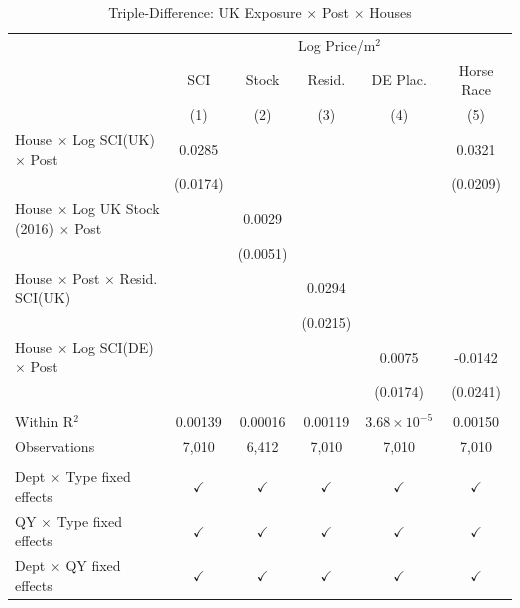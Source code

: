 
\begin{table}[htbp]
   \caption{\label{tab:triple} Triple-Difference: UK Exposure $\times$ Post $\times$ Houses}
   \bigskip
   \centering
   \begin{tabular}{lccccc}
      \toprule
       & \multicolumn{5}{c}{Log Price/m$^2$}\\
                                                         & SCI           & Stock         & Resid.        & DE Plac.              & Horse Race \\
                                                         & (1)           & (2)           & (3)           & (4)                   & (5)\\  
      \midrule 
      House $\times$ Log SCI(UK) $\times$ Post           & 0.0285        &               &               &                       & 0.0321\\   
                                                         & (0.0174)      &               &               &                       & (0.0209)\\   
      House $\times$ Log UK Stock (2016) $\times$ Post   &               & 0.0029        &               &                       &   \\   
                                                         &               & (0.0051)      &               &                       &   \\   
      House $\times$ Post $\times$ Resid. SCI(UK)        &               &               & 0.0294        &                       &   \\   
                                                         &               &               & (0.0215)      &                       &   \\   
      House $\times$ Log SCI(DE) $\times$ Post           &               &               &               & 0.0075                & -0.0142\\   
                                                         &               &               &               & (0.0174)              & (0.0241)\\   
       \\
      Within R$^2$                                       & 0.00139       & 0.00016       & 0.00119       & $3.68\times 10^{-5}$  & 0.00150\\  
      Observations                                       & 7,010         & 6,412         & 7,010         & 7,010                 & 7,010\\  
       \\
      Dept $\times$ Type fixed effects                   & $\checkmark$  & $\checkmark$  & $\checkmark$  & $\checkmark$          & $\checkmark$\\   
      QY $\times$ Type fixed effects                     & $\checkmark$  & $\checkmark$  & $\checkmark$  & $\checkmark$          & $\checkmark$\\   
      Dept $\times$ QY fixed effects                     & $\checkmark$  & $\checkmark$  & $\checkmark$  & $\checkmark$          & $\checkmark$\\   
      \bottomrule
   \end{tabular}
\end{table}


